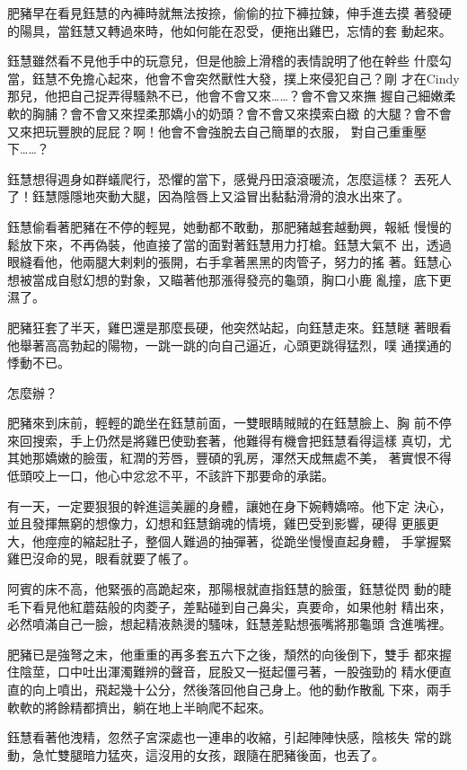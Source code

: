 肥豬早在看見鈺慧的內褲時就無法按捺，偷偷的拉下褲拉鍊，伸手進去摸
著發硬的陽具，當鈺慧又轉過來時，他如何能在忍受，便拖出雞巴，忘情的套
動起來。

鈺慧雖然看不見他手中的玩意兒，但是他臉上滑稽的表情說明了他在幹些
什麼勾當，鈺慧不免擔心起來，他會不會突然獸性大發，撲上來侵犯自己？剛
才在Cindy那兒，他把自己捉弄得騷熱不已，他會不會又來……？會不會又來撫
握自己細嫩柔軟的胸脯？會不會又來捏柔那嬌小的奶頭？會不會又來摸索白緻
的大腿？會不會又來把玩豐腴的屁屁？啊！他會不會強脫去自己簡單的衣服，
對自己重重壓下……？

鈺慧想得週身如群蟻爬行，恐懼的當下，感覺丹田滾滾暖流，怎麼這樣？
丟死人了！鈺慧隱隱地夾動大腿，因為陰唇上又溢冒出黏黏滑滑的浪水出來了。

鈺慧偷看著肥豬在不停的輕晃，她動都不敢動，那肥豬越套越動興，報紙
慢慢的鬆放下來，不再偽裝，他直接了當的面對著鈺慧用力打槍。鈺慧大氣不
出，透過眼縫看他，他兩腿大剌剌的張開，右手拿著黑黑的肉管子，努力的搖
著。鈺慧心想被當成自慰幻想的對象，又瞄著他那漲得發亮的龜頭，胸口小鹿
亂撞，底下更濕了。

肥豬狂套了半天，雞巴還是那麼長硬，他突然站起，向鈺慧走來。鈺慧瞇
著眼看他舉著高高勃起的陽物，一跳一跳的向自己逼近，心頭更跳得猛烈，噗
通撲通的悸動不已。

怎麼辦？

肥豬來到床前，輕輕的跪坐在鈺慧前面，一雙眼睛賊賊的在鈺慧臉上、胸
前不停來回搜索，手上仍然是將雞巴使勁套著，他難得有機會把鈺慧看得這樣
真切，尤其她那嬌嫩的臉蛋，紅潤的芳唇，豐碩的乳房，渾然天成無處不美，
著實恨不得低頭咬上一口，他心中忿忿不平，不該許下那要命的承諾。

有一天，一定要狠狠的幹進這美麗的身體，讓她在身下婉轉嬌啼。他下定
決心，並且發揮無窮的想像力，幻想和鈺慧銷魂的情境，雞巴受到影響，硬得
更脹更大，他痙痙的縮起肚子，整個人難過的抽彈著，從跪坐慢慢直起身體，
手掌握緊雞巴沒命的晃，眼看就要了帳了。

阿賓的床不高，他緊張的高跪起來，那陽根就直指鈺慧的臉蛋，鈺慧從閃
動的睫毛下看見他紅蘑菇般的肉菱子，差點碰到自己鼻尖，真要命，如果他射
精出來，必然噴滿自己一臉，想起精液熱燙的騷味，鈺慧差點想張嘴將那龜頭
含進嘴裡。

肥豬已是強弩之末，他重重的再多套五六下之後，頹然的向後倒下，雙手
都來握住陰莖，口中吐出渾濁難辨的聲音，屁股又一挺起僵弓著，一股強勁的
精水便直直的向上噴出，飛起幾十公分，然後落回他自己身上。他的動作散亂
下來，兩手軟軟的將餘精都擠出，躺在地上半晌爬不起來。

鈺慧看著他洩精，忽然子宮深處也一連串的收縮，引起陣陣快感，陰核失
常的跳動，急忙雙腿暗力猛夾，這沒用的女孩，跟隨在肥豬後面，也丟了。

